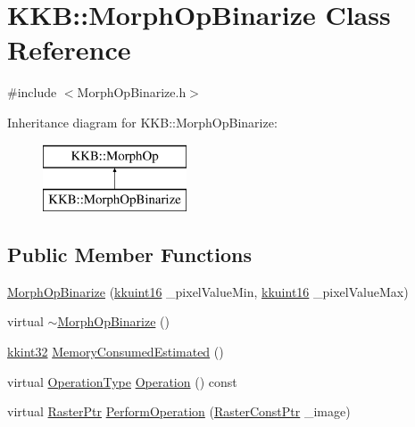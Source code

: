 \hypertarget{class_k_k_b_1_1_morph_op_binarize}{}\section{K\+KB\+:\+:Morph\+Op\+Binarize Class Reference}
\label{class_k_k_b_1_1_morph_op_binarize}


{\ttfamily \#include $<$Morph\+Op\+Binarize.\+h$>$}

Inheritance diagram for K\+KB\+:\+:Morph\+Op\+Binarize\+:\begin{figure}[H]
\begin{center}
\leavevmode
\includegraphics[height=2.000000cm]{class_k_k_b_1_1_morph_op_binarize}
\end{center}
\end{figure}
\subsection*{Public Member Functions}
\begin{DoxyCompactItemize}
\item 
\hyperlink{class_k_k_b_1_1_morph_op_binarize_aeb4c8e842f2bde9628a8e16e57c08a77}{Morph\+Op\+Binarize} (\hyperlink{namespace_k_k_b_aa8c7d4d30381c8a0b6fce68974a9c8a9}{kkuint16} \+\_\+pixel\+Value\+Min, \hyperlink{namespace_k_k_b_aa8c7d4d30381c8a0b6fce68974a9c8a9}{kkuint16} \+\_\+pixel\+Value\+Max)
\item 
virtual \hyperlink{class_k_k_b_1_1_morph_op_binarize_aac7d39b809e44ca6c44d1886765131e4}{$\sim$\+Morph\+Op\+Binarize} ()
\item 
\hyperlink{namespace_k_k_b_a8fa4952cc84fda1de4bec1fbdd8d5b1b}{kkint32} \hyperlink{class_k_k_b_1_1_morph_op_binarize_a42922ac8c4a1fc55c0b93c6a3fcea6b6}{Memory\+Consumed\+Estimated} ()
\item 
virtual \hyperlink{class_k_k_b_1_1_morph_op_a32070d9c14d16849873a8a409f5b0d69}{Operation\+Type} \hyperlink{class_k_k_b_1_1_morph_op_binarize_a4f06fa91ef03dca96bf2f1494da85678}{Operation} () const 
\item 
virtual \hyperlink{namespace_k_k_b_a80d46bd24db644a022c863bce8ae3633}{Raster\+Ptr} \hyperlink{class_k_k_b_1_1_morph_op_binarize_ae8f1b98cf24b7cb143126d5560acbbaf}{Perform\+Operation} (\hyperlink{namespace_k_k_b_a5acfa7402dc4df1769f90d3dc8ddfc2c}{Raster\+Const\+Ptr} \+\_\+image)
\end{DoxyCompactItemize}
